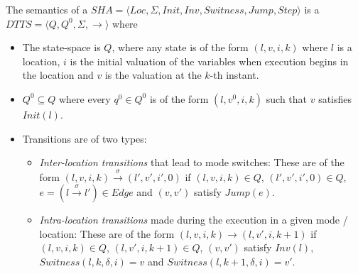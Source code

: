 \begin{definition}
	The semantics of a \newline
	$SHA = \langle Loc,  \Sigma, Init, Inv, Switness, Jump, Step \rangle$
	 is a 
	$DTTS = \langle Q, Q^0, \Sigma, \rightarrow \rangle$ where
	
	\begin{itemize}
		\item The state-space is $Q$, where any state is of the form
		$(l, v, i, k)$ where $l$ is a location, $i$ is the initial valuation
		of the variables when execution begins in the location and $v$ is
		the valuation at the $k$-th instant.
		\item $Q^0 \subseteq Q$ where every $q^0 \in Q^0$ is of the form
		$(l, v^0, i, k)$ such that $v$ satisfies $Init(l)$.
		\item Transitions are of two types:
		\begin{itemize}
			\item \emph{Inter-location transitions} that lead to mode switches:
			These are of the form
			$(l, v, i, k) \stackrel{\sigma} \rightarrow (l', v', i', 0)$ if
			$(l, v, i, k) \in Q$, $(l', v', i', 0) \in Q$,
			$e=(l \stackrel{\sigma} \rightarrow l') \in Edge$ and $(v, v')$
			satisfy $Jump(e)$.
			\item \emph{Intra-location transitions} made during the execution in
			a given mode / location: These are of the form
			$(l, v, i, k) \rightarrow (l, v', i, k+1)$ if
			$(l, v, i, k) \in Q$, $(l, v', i, k+1) \in Q$, $(v, v')$ satisfy
			$Inv(l)$, $Switness(l,k,\delta,i)=v$ and $Switness(l,k+1,\delta,i)=v'$.
		\end{itemize}
	\end{itemize}
	\label{def:dtts}
\end{definition}

